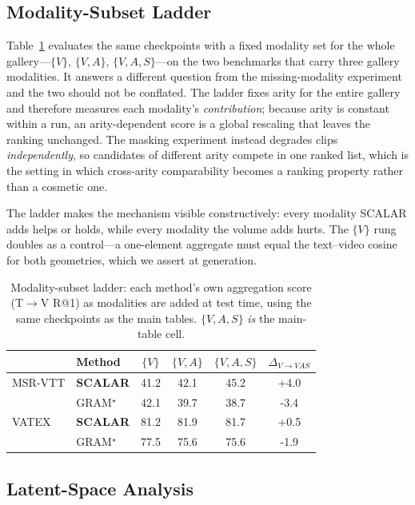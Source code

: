\documentclass[10pt,twocolumn,letterpaper]{article}
\newcommand{\ours}{SCALAR}
\begin{document}
\subsection{Modality-Subset Ladder}
\label{sec:ladder}

Table~\ref{tab:subset_ladder} evaluates the same checkpoints with a fixed
modality set for the whole gallery---$\{V\}$, $\{V,A\}$, $\{V,A,S\}$---on the
two benchmarks that carry three gallery modalities. It answers a different
question from the missing-modality experiment and the two should not be
conflated. The ladder fixes arity for the entire gallery and therefore measures
each modality's \emph{contribution}; because arity is constant within a run, an
arity-dependent score is a global rescaling that leaves the ranking unchanged.
The masking experiment instead degrades clips \emph{independently}, so
candidates of different arity compete in one ranked list, which is the setting
in which cross-arity comparability becomes a ranking property rather than a
cosmetic one.

The ladder makes the mechanism visible constructively: every modality \ours{}
adds helps or holds, while every modality the volume adds hurts. The $\{V\}$
rung doubles as a control---a one-element aggregate must equal the text--video
cosine for both geometries, which we assert at generation.

\begin{table}[t]
\centering
\caption{Modality-subset ladder: each method's own aggregation score
(T$\rightarrow$V R@1) as modalities are added at test time, using the same
checkpoints as the main tables. $\{V,A,S\}$ \emph{is} the main-table cell.}
\label{tab:subset_ladder}
\small
\setlength{\tabcolsep}{6pt}
\begin{tabular}{llccc c}
\toprule
 & Method & $\{V\}$ & $\{V,A\}$ & $\{V,A,S\}$ & $\Delta_{V \to VAS}$ \\
\midrule
MSR-VTT & \textbf{\ours{}} & 41.2 & 42.1 & 45.2 & +4.0 \\
 & GRAM$^{\star}$ & 42.1 & 39.7 & 38.7 & -3.4 \\
\midrule
VATEX & \textbf{\ours{}} & 81.2 & 81.9 & 81.7 & +0.5 \\
 & GRAM$^{\star}$ & 77.5 & 75.6 & 75.6 & -1.9 \\
\bottomrule
\end{tabular}
\end{table}

\subsection{Latent-Space Analysis}
\label{sec:tsne}
\end{document}
